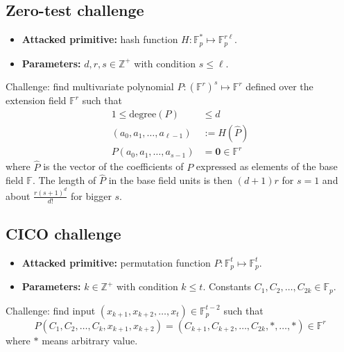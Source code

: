 \documentclass{article}
\begin{document}
\subsection{Zero-test challenge}

\begin{itemize}
    \item
\textbf{Attacked primitive:} hash function $H:\mathbb{F}_p^{*}\mapsto \mathbb{F}_p^{r\ell}$.
\item
\textbf{Parameters:} $d,r,s\in\mathbb{Z}^{+}$ with condition $s\leq \ell$.

\end{itemize}
Challenge: find multivariate polynomial  $P:\left(\mathbb{F}^r\right)^s\mapsto\mathbb{F}^r$ defined over the extension field $\mathbb{F}^r$ such that
\begin{align}
1\leq \mathrm{degree}(P)&\leq d\\
(a_0,a_1,\ldots,a_{\ell-1}) &:=H(\widehat{P}) \\
P(a_0,a_1, \ldots,a_{s-1})&=\mathbf{0}\in\mathbb{F}^r\label{eq:cond-zero}
\end{align}
where $\widehat{P}$ is the vector of the coefficients of $P$ expressed as elements of the base field $\mathbb{F}$. The length of  $\widehat{P}$ in the base field units is then $(d+1)r$ for $s=1$ and about $\frac{r(s+1)^d}{d!}$ for bigger $s$.


\subsection{CICO challenge}
\begin{itemize}
    \item
\textbf{Attacked primitive:} permutation function
$P:\mathbb{F}_p^{t}\mapsto \mathbb{F}_p^{t}$.
\item
\textbf{Parameters:} $k\in\mathbb{Z}^{+}$ with condition $k\leq t$. Constants
$C_1,C_2,\ldots,C_{2k}\in\mathbb{F}_p$.

\end{itemize}
Challenge: find input $(x_{k+1},x_{k+2},\ldots,x_t)\in\mathbb{F}_p^{t-2}$
such that
\begin{equation}
P(C_1,C_2, \ldots,C_k,x_{k+1},x_{k+2})=(C_{k+1},C_{k+2},\ldots,C_{2k},*,\ldots,*)
\in\mathbb{F}^r\label{eq:cico-k}
\end{equation}
where $*$ means arbitrary value.
\end{document}
